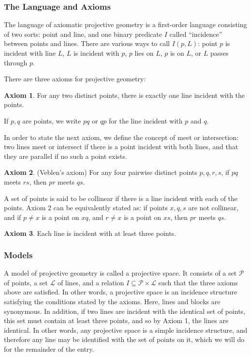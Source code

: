 \documentclass[12pt]{article}
\begin{document}

\subsubsection*{The Language and Axioms}

The language of axiomatic projective geometry is a first-order language consisting of two sorts: point and line, and one binary predicate $I$ called ``incidence'' between points and lines.  There are various ways to call $I(p,L)$: point $p$ is incident with line $L$, $L$ is incident with $p$, $p$ lies on $L$, $p$ is on $L$, or $L$ passes through $p$.

There are three axioms for projective geometry:

\textbf{Axiom 1}.  For any two distinct points, there is exactly one line incident with the points.

If $p,q$ are points, we write $pq$ or $qp$ for the line incident with $p$ and $q$.

In order to state the next axiom, we define the concept of meet or intersection: two lines meet or intersect if there is a point incident with both lines, and that they are parallel if no such a point exists.

\textbf{Axiom 2}. (Veblen's axiom) For any four pairwise distinct points $p,q,r,s$, if $pq$ meets $rs$, then $pr$ meets $qs$.

A set of points is said to be collinear if there is a line incident with each of the points.  Axiom 2 can be equivalently stated as: if points $x,q,s$ are not collinear, and if $p\ne x$ is a point on $xq$, and $r\ne x$ is a point on $xs$, then $pr$ meets $qs$.

\textbf{Axiom 3}. Each line is incident with at least three points.

\subsubsection*{Models}

A model of projective geometry is called a projective space.  It consists of a set $\mathcal{P}$ of points, a set $\mathcal{L}$ of lines, and a relation $I\subseteq \mathcal{P}\times \mathcal{L}$ such that the three axioms above are satisfied.  In other words, a projective space is an incidence structure satisfying the conditions stated by the axioms.  Here, lines and blocks are synonymous.  In addition, if two lines are incident with the identical set of points, this set must contain at least three points, and so by Axiom 1, the lines are identical.  In other words, any projective space is a simple incidence structure, and therefore any line may be identified with the set of points on it, which we will do for the remainder of the entry.
\end{document}
